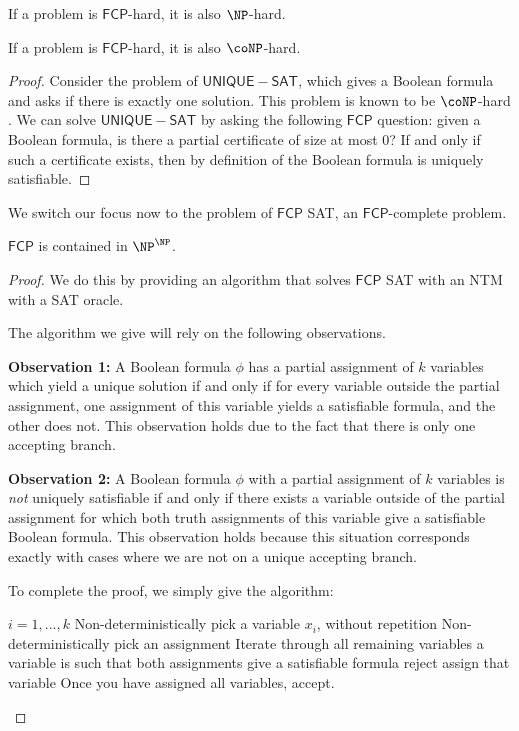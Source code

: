 \documentclass[runningheads,a4paper]{llncs}
\begin{document}
\begin{corollary}
If a problem is $\mathsf{FCP}$-hard, it is also $\NP$-hard.
\end{corollary}

\begin{proposition}
If a problem is $\mathsf{FCP}$-hard, it is also $\coNP$-hard. 
\end{proposition}

\begin{proof}
Consider the problem of $\mathsf{UNIQUE-SAT}$, which gives a Boolean formula and asks if there is exactly one solution. This problem is known to be $\coNP$-hard \cite{blass1982unique}. We can solve $\mathsf{UNIQUE-SAT}$ by asking the following $\mathsf{FCP}$ question: given a Boolean formula, is there a partial certificate of size at most 0? If and only if such a certificate exists, then by definition of the Boolean formula is uniquely satisfiable.
\end{proof}

We switch our focus now to the problem of $\mathsf{FCP}$ SAT, an $\mathsf{FCP}$-complete problem. 

\begin{proposition}
$\mathsf{FCP}$ is contained in $\NP^{\NP}$.
\end{proposition}

\begin{proof}
We do this by providing an algorithm that solves $\mathsf{FCP}$ SAT with an NTM with a SAT oracle. 

The algorithm we give will rely on the following observations.

\textbf{Observation 1:} A Boolean formula $\phi$ has a partial assignment of $k$ variables which yield a unique solution if and only if for every variable outside the partial assignment, one assignment of this variable yields a satisfiable formula, and the other does not. This observation holds due to the fact that there is only one accepting branch.

\textbf{Observation 2:} A Boolean formula $\phi$ with a partial assignment of $k$ variables is \emph{not} uniquely satisfiable if and only if there exists a variable outside of the partial assignment for which both truth assignments of this variable give a satisfiable Boolean formula. This observation holds because this situation corresponds exactly with cases where we are not on a unique accepting branch.

To complete the proof, we simply give the algorithm:

\begin{codebox}
\li \For $i = 1, ..., k$ \Then
\li Non-deterministically pick a variable $x_i$, without repetition
\li Non-deterministically pick an assignment \End
\li Iterate through all remaining variables \Then
\li \If a variable is such that both assignments give a satisfiable formula \Then
\li reject
\li \Else assign that variable \End \End
\li Once you have assigned all variables, accept.
\end{codebox}
\end{proof}
\end{document}
